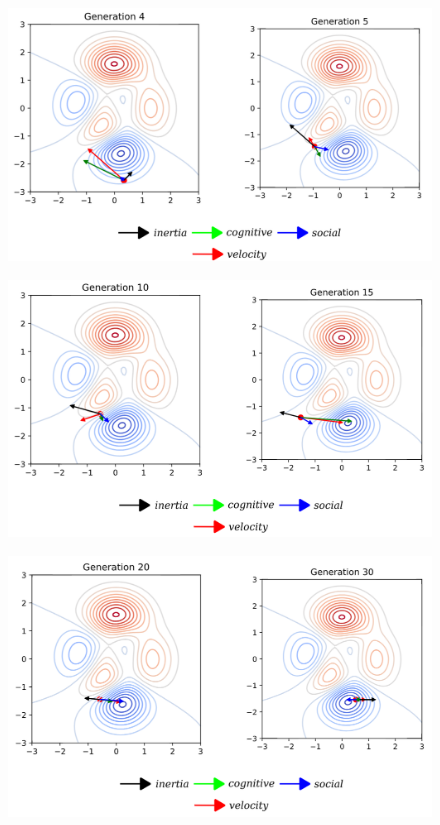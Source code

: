 \documentclass{book}
\begin{document}
\begin{figure}[H]
    \centering
    \includegraphics[width=0.75\linewidth]{images/GA-3_57.png}
\end{figure}

\begin{figure}[H]
    \centering
    \includegraphics[width=0.75\linewidth]{images/GA-3_48.png}
\end{figure}

\begin{figure}[H]
    \centering
    \includegraphics[width=0.75\linewidth]{images/GA-3_49.png}
\end{figure}
\end{document}
